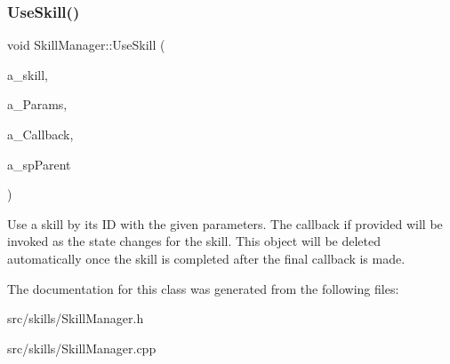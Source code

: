 \subsubsection{\texorpdfstring{Use\+Skill()}{UseSkill()}}
{\footnotesize\ttfamily void Skill\+Manager\+::\+Use\+Skill (\begin{DoxyParamCaption}\item[{const std\+::string \&}]{a\+\_\+skill,  }\item[{const \hyperlink{class_params_map}{Params\+Map} \&}]{a\+\_\+\+Params,  }\item[{const Delegate$<$ \hyperlink{class_skill_instance}{Skill\+Instance} $\ast$$>$ \&}]{a\+\_\+\+Callback,  }\item[{const \hyperlink{class_i_thing_a6e95654aef6362c48b9a2fd44a1f970a}{I\+Thing\+::\+SP} \&}]{a\+\_\+sp\+Parent }\end{DoxyParamCaption})\hspace{0.3cm}{\ttfamily [inline]}}

Use a skill by it\textquotesingle{}s ID with the given parameters. The callback if provided will be invoked as the state changes for the skill. This object will be deleted automatically once the skill is completed after the final callback is made. 

The documentation for this class was generated from the following files\+:\begin{DoxyCompactItemize}
\item 
src/skills/Skill\+Manager.\+h\item 
src/skills/Skill\+Manager.\+cpp\end{DoxyCompactItemize}
